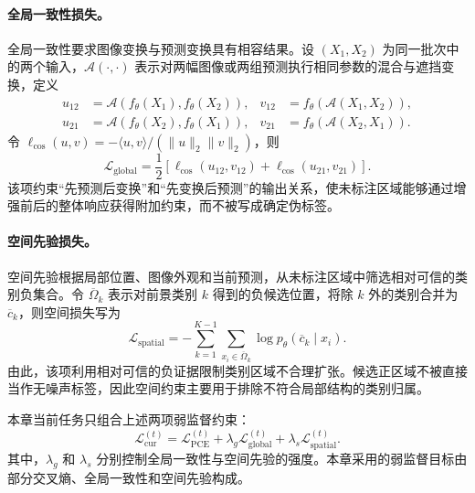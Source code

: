 \paragraph{全局一致性损失。}
全局一致性要求图像变换与预测变换具有相容结果\cite{zhang2026zscribbleseg}。设 $(X_1,X_2)$ 为同一批次中的两个输入，$\mathcal{A}(\cdot,\cdot)$ 表示对两幅图像或两组预测执行相同参数的混合与遮挡变换，定义
\begin{equation}
\begin{aligned}
u_{12}&=\mathcal{A}\!\left(f_{\theta}(X_1),f_{\theta}(X_2)\right),
&v_{12}&=f_{\theta}\!\left(\mathcal{A}(X_1,X_2)\right),\\
u_{21}&=\mathcal{A}\!\left(f_{\theta}(X_2),f_{\theta}(X_1)\right),
&v_{21}&=f_{\theta}\!\left(\mathcal{A}(X_2,X_1)\right).
\end{aligned}
\label{eq:scribblecl-global-pairs}
\end{equation}
令
$\ell_{\cos}(u,v)=-\langle u,v\rangle/(\|u\|_2\|v\|_2)$，则
\begin{equation}
\mathcal{L}_{\mathrm{global}}
=
\frac{1}{2}
\left[
\ell_{\cos}(u_{12},v_{12})
+
\ell_{\cos}(u_{21},v_{21})
\right].
\label{eq:scribblecl-global-loss}
\end{equation}
该项约束“先预测后变换”和“先变换后预测”的输出关系，使未标注区域能够通过增强前后的整体响应获得附加约束，而不被写成确定伪标签\cite{zhang2026zscribbleseg}。

\paragraph{空间先验损失。}
空间先验根据局部位置、图像外观和当前预测，从未标注区域中筛选相对可信的类别负集合。令 $\overline{\Omega}_k$ 表示对前景类别 $k$ 得到的负候选位置，将除 $k$ 外的类别合并为 $\overline c_k$，则空间损失写为
\begin{equation}
\mathcal{L}_{\mathrm{spatial}}
=
-
\sum_{k=1}^{K-1}
\sum_{x_i\in\overline{\Omega}_k}
\log p_{\theta}(\overline c_k\mid x_i).
\label{eq:scribblecl-spatial-loss}
\end{equation}
由此，该项利用相对可信的负证据限制类别区域不合理扩张。候选正区域不被直接当作无噪声标签，因此空间约束主要用于排除不符合局部结构的类别归属\cite{zhang2026zscribbleseg}。

本章当前任务只组合上述两项弱监督约束：
\begin{equation}
\mathcal{L}_{\mathrm{cur}}^{(t)}
=
\mathcal{L}_{\mathrm{PCE}}^{(t)}
+
\lambda_{g}\mathcal{L}_{\mathrm{global}}^{(t)}
+
\lambda_{s}\mathcal{L}_{\mathrm{spatial}}^{(t)}.
\label{eq:scribblecl-current-loss}
\end{equation}
其中，$\lambda_g$ 和 $\lambda_s$ 分别控制全局一致性与空间先验的强度。本章采用的弱监督目标由部分交叉熵、全局一致性和空间先验构成\cite{zhang2026zscribbleseg}。

